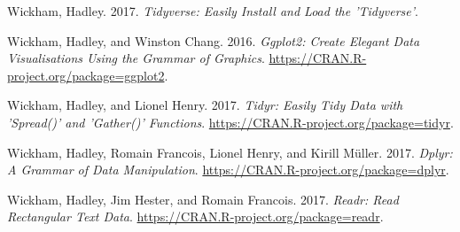 \documentclass[12pt,]{krantz}
\theoremstyle{definition}
\theoremstyle{definition}
\theoremstyle{definition}
\theoremstyle{remark}
\begin{document}
\hypertarget{ref-R-tidyverse}{}
Wickham, Hadley. 2017. \emph{Tidyverse: Easily Install and Load the
'Tidyverse'}.

\hypertarget{ref-R-ggplot2}{}
Wickham, Hadley, and Winston Chang. 2016. \emph{Ggplot2: Create Elegant
Data Visualisations Using the Grammar of Graphics}.
\url{https://CRAN.R-project.org/package=ggplot2}.

\hypertarget{ref-R-tidyr}{}
Wickham, Hadley, and Lionel Henry. 2017. \emph{Tidyr: Easily Tidy Data
with 'Spread()' and 'Gather()' Functions}.
\url{https://CRAN.R-project.org/package=tidyr}.

\hypertarget{ref-R-dplyr}{}
Wickham, Hadley, Romain Francois, Lionel Henry, and Kirill Müller. 2017.
\emph{Dplyr: A Grammar of Data Manipulation}.
\url{https://CRAN.R-project.org/package=dplyr}.

\hypertarget{ref-R-readr}{}
Wickham, Hadley, Jim Hester, and Romain Francois. 2017. \emph{Readr:
Read Rectangular Text Data}.
\url{https://CRAN.R-project.org/package=readr}.
\end{document}
